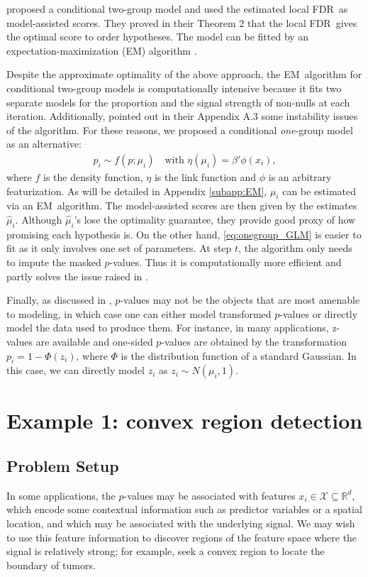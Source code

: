 \documentclass{biometrika}
\newcommand{\textFDR}{FDR}
\newcommand{\EM}{EM}
\newcommand{\R}{\mathbb{R}}
\newcommand{\1}{\mathbf{1}}
\begin{document}
\cite{lei2018adapt} proposed a conditional two-group model and used the estimated local \textFDR ~as model-assisted scores. They proved in their Theorem 2 that the local \textFDR ~gives the optimal score to order hypotheses. The model can be fitted by an expectation-maximization (\EM) algorithm \citep[Appendix A of ][]{lei2018adapt}. 

Despite the approximate optimality of the above approach, the \EM ~algorithm for conditional two-group models is computationally intensive because it fits two separate models for the proportion and the signal strength of non-nulls at each iteration. Additionally, \cite{lei2018adapt} pointed out in their Appendix A.3 some instability issues of the algorithm. For these reasons, we proposed a conditional \textit{one}-group model as an alternative:
\begin{align}
  p_i \sim f(p; \mu_{i})\quad\text{with } \eta(\mu_i) = \beta'\phi(x_i),\label{eq:onegroup_GLM}
\end{align}
where $f$ is the density function, $\eta$ is the link function and $\phi$ is an arbitrary featurization. As will be detailed in Appendix \ref{subapp:EM}, $\mu_{i}$ can be estimated via an \EM ~algorithm. The model-assisted scores are then given by the estimates $\hat{\mu}_{i}$. Although $\hat{\mu}_{i}$'s lose the optimality guarantee, they provide good proxy of how promising each hypothesis is. On the other hand, \eqref{eq:onegroup_GLM} is easier to fit as it only involves one set of parameters. At step $t$, the algorithm only needs to impute the masked $p$-values. Thus it is computationally more efficient and partly solves the issue raised in \cite{lei2018adapt}. 

Finally, as discussed in \cite{lei2018adapt}, $p$-values may not be the objects that are most amenable to modeling, in which case one can either model transformed $p$-values or directly model the data used to produce them. For instance, in many applications, z-values are available and one-sided $p$-values are obtained by the transformation $p_{i} = 1 - \Phi(z_{i})$, where $\Phi$ is the distribution function of a standard Gaussian. In this case, we can directly model $z_{i}$ as $z_{i}\sim N(\mu_{i}, 1)$.

\section{Example 1: convex region detection}\label{sec:convex}
\subsection{Problem Setup}
In some applications, the $p$-values may be associated with features $x_{i}\in \mathcal{X} \subseteq \R^d$, which encode some contextual information such as predictor variables or a spatial location, and which may be associated with the underlying signal. We may wish to use this feature information to discover regions of the feature space where the signal is relatively strong; for example, \citet{drevelegas10} seek a convex region to locate the boundary of tumors.
\end{document}
